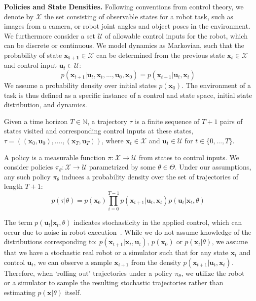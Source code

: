 \documentclass[10pt, conference]{ieeeconf}      %
\newcommand{\bu}{\mathbf{u}}
\newcommand{\bx}{\mathbf{x}}
\begin{document}
\noindent\textbf{Policies and State Densities.}
Following conventions from control theory, we denote by $\mathcal{X}$ the set consisting of observable states for a robot task, such as images from a camera, or robot joint angles and object poses in the environment.
We furthermore consider a set $\mathcal{U}$ of allowable control inputs for the robot, which can be discrete or
continuous. We model dynamics as Markovian, such that the probability of state $\mathbf{x_{t+1}}\in
\mathcal{X}$ can be determined from the previous state $\mathbf{x}_t\in\mathcal{X}$ and control input $\mathbf{u}_t\in
\mathcal{U}$: 
$$p(\bx_{t+1}|\bu_{t},\bx_{t}, \ldots, \bu_{0}, \bx_{0})=p(\bx_{t+1}|\bu_{t}, \bx_t)$$
We assume a probability density over initial states $p(\bx_0)$.
The environment of a task is thus defined as a specific instance of a control and state space, initial state distribution, and dynamics. 



Given a time horizon $T\in \mathbb{N}$, a trajectory $\tau$ is a finite sequence of $T+1$ pairs of states visited and corresponding
control inputs at these states, $\tau = ((\mathbf{x}_0,\mathbf{u}_0), ...., (\mathbf{x}_T,\mathbf{u}_T))$, where $\bx_t\in \mathcal{X}$
and $\bu_t\in \mathcal{U}$ for $t\in \{0, \ldots, T\}$.


A policy is a measurable function $\pi: \mathcal{X} \to \mathcal{U}$ from states to control inputs. 
We consider policies $\pi_{\theta}:\mathcal{X}\to \mathcal{U}$ parametrized by some $\theta\in \Theta$. Under our assumptions, any such policy $\pi_{\theta}$ induces a probability density over the set of  trajectories of length $T+1$: $$p(\tau | \theta)=
p(\bx_0)\prod_{i=0}^{T-1}p(\bx_{t+1}|\bu_t,\bx_t)p(\bu_t|\bx_t,\theta)$$


The term $p(\bu_t|\bx_t,\theta)$ indicates stochasticity in the applied control, which can occur due to noise in robot execution~\cite{mahler2014learning}.
While we do not assume knowledge of the distributions corresponding to: $p(\bx_{t+1}|\bx_t,\bu_t)$, $p(\bx_0)$ or $p(\bx_t|
\theta)$, we assume that we have a stochastic real robot or a simulator such that for any state
$\bx_t$ and control $\bu_t$, we can observe a sample $\bx_{t+1}$ from the density $p(\bx_{t+1}|\bu_t,\bx_t)$. 
Therefore, when `rolling out' trajectories under a policy
$\pi_{\theta}$, we utilize the robot or a simulator to sample the resulting stochastic trajectories rather than
estimating $p(\bx|\theta)$ itself.
\end{document}
